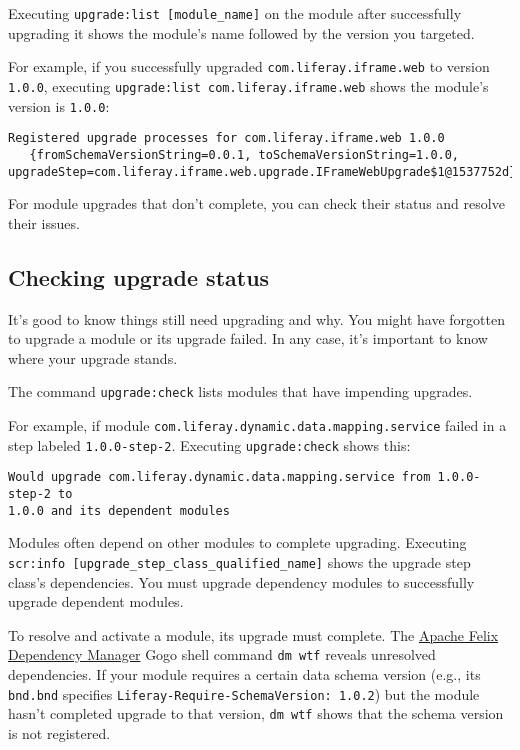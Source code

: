 Executing \texttt{upgrade:list\ {[}module\_name{]}} on the module after
successfully upgrading it shows the module's name followed by the
version you targeted.

For example, if you successfully upgraded
\texttt{com.liferay.iframe.web} to version \texttt{1.0.0}, executing
\texttt{upgrade:list\ com.liferay.iframe.web} shows the module's version
is \texttt{1.0.0}:

\begin{verbatim}
Registered upgrade processes for com.liferay.iframe.web 1.0.0
   {fromSchemaVersionString=0.0.1, toSchemaVersionString=1.0.0, upgradeStep=com.liferay.iframe.web.upgrade.IFrameWebUpgrade$1@1537752d}
\end{verbatim}

For module upgrades that don't complete, you can check their status and
resolve their issues.

\subsection{Checking upgrade status}\label{checking-upgrade-status}

It's good to know things still need upgrading and why. You might have
forgotten to upgrade a module or its upgrade failed. In any case, it's
important to know where your upgrade stands.

The command \texttt{upgrade:check} lists modules that have impending
upgrades.

For example, if module \texttt{com.liferay.dynamic.data.mapping.service}
failed in a step labeled \texttt{1.0.0-step-2}. Executing
\texttt{upgrade:check} shows this:

\begin{verbatim}
Would upgrade com.liferay.dynamic.data.mapping.service from 1.0.0-step-2 to
1.0.0 and its dependent modules
\end{verbatim}

Modules often depend on other modules to complete upgrading. Executing
\texttt{scr:info\ {[}upgrade\_step\_class\_qualified\_name{]}} shows the
upgrade step class's dependencies. You must upgrade dependency modules
to successfully upgrade dependent modules.

To resolve and activate a module, its upgrade must complete. The
\href{http://felix.apache.org/documentation/subprojects/apache-felix-dependency-manager/tutorials/leveraging-the-shell.html}{Apache
Felix Dependency Manager} Gogo shell command \texttt{dm\ wtf} reveals
unresolved dependencies. If your module requires a certain data schema
version (e.g., its \texttt{bnd.bnd} specifies
\texttt{Liferay-Require-SchemaVersion:\ 1.0.2}) but the module hasn't
completed upgrade to that version, \texttt{dm\ wtf} shows that the
schema version is not registered.

